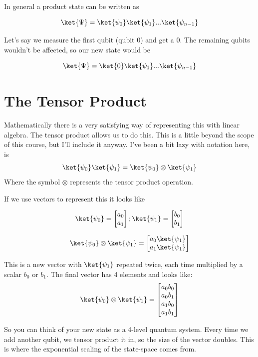 \documentclass{book}
\begin{document}
In general a product state can be written as 

$$ \ket{\Psi} = \ket{\psi_0}\ket{\psi_1}...\ket{\psi_{n-1}}$$

Let's say we measure the first qubit (qubit 0) and get a 0. The remaining qubits wouldn't be affected, so our new state would be 

$$ \ket{\Psi} = \ket{0}\ket{\psi_1}...\ket{\psi_{n-1}}$$

\section{ The Tensor Product }

Mathematically there is a very satisfying way of representing this with linear algebra. The tensor product allows us to do this. This is a little beyond the scope of this course, but I'll include it anyway. 
I've been a bit lazy with notation here, is
$$ \ket{\psi_0}\ket{\psi_1} = \ket{\psi_0} \otimes \ket{\psi_1} $$
Where the symbol $\otimes$ represents the tensor product operation. 

If we use vectors to represent this it looks like 

$$ \ket{\psi_0} = \begin{bmatrix} a_0 \\ a_1 \end{bmatrix} ; \ket{\psi_1} = \begin{bmatrix} b_0 \\ b_1 \end{bmatrix} $$

$$
 \ket{\psi_0} \otimes \ket{\psi_1} = \begin{bmatrix} a_0\ket{\psi_1} \\ a_1\ket{\psi_1} \end{bmatrix}
$$

This is a new vector with $\ket{\psi_1}$ repeated twice, each time multiplied by a scalar $b_0$ or $b_1$. The final vector has 4 elements and looks like: 
$$
 \ket{\psi_0} \otimes \ket{\psi_1} = \begin{bmatrix} a_0 b_0 \\ a_0 b_1 \\ a_1b_0 \\ a_1 b_1 \end{bmatrix}
$$

So you can think of your new state as a 4-level quantum system. Every time we add another qubit, we tensor product it in, so the size of the vector doubles. This is where the exponential scaling of the state-space comes from.
\end{document}
